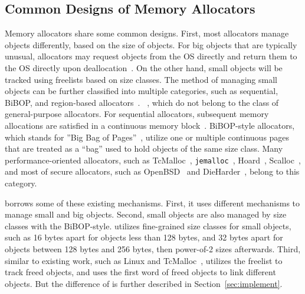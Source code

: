 


\subsection{Common Designs of Memory Allocators}

Memory allocators share some common designs. First, most allocators manage objects differently, based on the size of objects. For big objects that are typically unusual, allocators may request objects from the OS directly and return them to the OS directly upon  deallocation~\citep{Hoard}. On the other hand, small objects will be tracked using freelists based on size classes. The method of managing small objects can be further classified into multiple categories, such as sequential, BiBOP, and region-based allocators~\citep{DieHarder, Gay:1998:MME:277650.277748}. ~\citep{Gay:1998:MME:277650.277748}, which do not belong to the class of general-purpose allocators. For sequential allocators, subsequent memory allocations are satisfied in a continuous memory block~\citep{Cling}. BiBOP-style allocators, which stands for ''Big Bag of Pages''~\citep{hanson1980}, utilize one or multiple continuous pages that are treated as a ``bag'' used to hold objects of the same size class. Many performance-oriented allocators, such as TcMalloc~\citep{tcmalloc}, \texttt{jemalloc}~\citep{jemalloc}, Hoard~\citep{Hoard}, Scalloc~\citep{Scalloc}, and most of secure allocators, such as OpenBSD~\citep{openbsd} and DieHarder~\citep{DieHarder}, belong to this category. 

\NM{} borrows some of these existing mechanisms. First, it uses different mechanisms to manage small and big objects. Second, small objects are also managed by size classes with the BiBOP-style. \NA{} utilizes fine-grained size classes for small objects, such as 16 bytes apart for objects less than 128 bytes, and 32 bytes apart for objects between 128 bytes and 256 bytes, then power-of-2 sizes afterwards. Third, similar to existing work, such as Linux and TcMalloc~\cite{tcmalloc}, \NA{} utilizes  the freelist to track freed objects, and uses the first word of freed objects to link different objects. But the difference of \NM{} is further described in Section~\ref{sec:implement}. 

